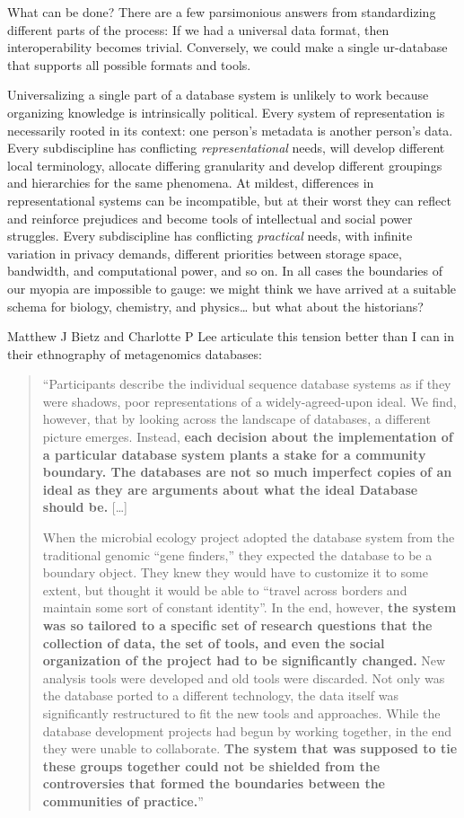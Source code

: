 \documentclass[10pt]{article}
\begin{document}
\begin{multicols}{2}
What can be done? There are a few parsimonious answers from
standardizing different parts of the process: If we had a universal data
format, then interoperability becomes trivial. Conversely, we could make
a single ur-database that supports all possible formats and tools.

Universalizing a single part of a database system is unlikely to work
because organizing knowledge is intrinsically political. Every system of
representation is necessarily rooted in its context: one person's
metadata is another person's data. Every subdiscipline has conflicting
\emph{representational} needs, will develop different local terminology,
allocate differing granularity and develop different groupings and
hierarchies for the same phenomena. At mildest, differences in
representational systems can be incompatible, but at their worst they
can reflect and reinforce prejudices and become tools of intellectual
and social power struggles. Every subdiscipline has conflicting
\emph{practical} needs, with infinite variation in privacy demands,
different priorities between storage space, bandwidth, and computational
power, and so on. In all cases the boundaries of our myopia are
impossible to gauge: we might think we have arrived at a suitable schema
for biology, chemistry, and physics\ldots{} but what about the
historians?

Matthew J Bietz and Charlotte P Lee articulate this tension better than
I can in their ethnography of metagenomics databases:

\begin{quote}
``Participants describe the individual sequence database systems as if
they were shadows, poor representations of a widely-agreed-upon ideal.
We find, however, that by looking across the landscape of databases, a
different picture emerges. Instead, \textbf{each decision about the
implementation of a particular database system plants a stake for a
community boundary. The databases are not so much imperfect copies of an
ideal as they are arguments about what the ideal Database should be.}
{[}\ldots{]}

When the microbial ecology project adopted the database system from the
traditional genomic ``gene finders,'' they expected the database to be a
boundary object. They knew they would have to customize it to some
extent, but thought it would be able to ``travel across borders and
maintain some sort of constant identity''. In the end, however,
\textbf{the system was so tailored to a specific set of research
questions that the collection of data, the set of tools, and even the
social organization of the project had to be significantly changed.} New
analysis tools were developed and old tools were discarded. Not only was
the database ported to a different technology, the data itself was
significantly restructured to fit the new tools and approaches. While
the database development projects had begun by working together, in the
end they were unable to collaborate. \textbf{The system that was
supposed to tie these groups together could not be shielded from the
controversies that formed the boundaries between the communities of
practice.}'' \cite{bietzCollaborationMetagenomicsSequence2009} 
\end{quote}


\end{multicols}
\end{document}
